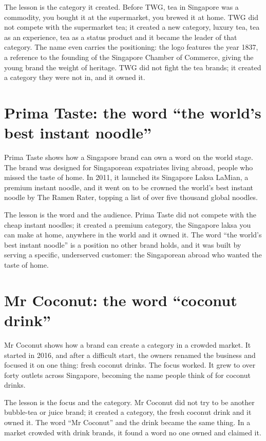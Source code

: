 \documentclass[10pt,twoside,openany]{memoir}
\newcommand{\needspacehead}{\needspace{4\baselineskip}}
\let\oldsection\section
\renewcommand{\section}{\needspacehead\oldsection}
\begin{document}
The lesson is the category it created. Before TWG, tea in Singapore was
a commodity, you bought it at the supermarket, you brewed it at home.
TWG did not compete with the supermarket tea; it created a new category,
luxury tea, tea as an experience, tea as a status product and it became
the leader of that category. The name even carries the positioning: the
logo features the year 1837, a reference to the founding of the
Singapore Chamber of Commerce, giving the young brand the weight of
heritage. TWG did not fight the tea brands; it created a category they
were not in, and it owned it.

\section{Prima Taste: the word ``the world's best instant
noodle''}\label{prima-taste-the-word-the-worlds-best-instant-noodle}

Prima Taste shows how a Singapore brand can own a word on the world
stage. The brand was designed for Singaporean expatriates living abroad,
people who missed the taste of home. In 2011, it launched its Singapore
Laksa LaMian, a premium instant noodle, and it went on to be crowned the
world's best instant noodle by The Ramen Rater, topping a list of over
five thousand global noodles.

The lesson is the word and the audience. Prima Taste did not compete
with the cheap instant noodles; it created a premium category, the
Singapore laksa you can make at home, anywhere in the world and it owned
it. The word ``the world's best instant noodle'' is a position no other
brand holds, and it was built by serving a specific, underserved
customer: the Singaporean abroad who wanted the taste of home.

\section{Mr Coconut: the word ``coconut
drink''}\label{mr-coconut-the-word-coconut-drink}

Mr Coconut shows how a brand can create a category in a crowded market.
It started in 2016, and after a difficult start, the owners renamed the
business and focused it on one thing: fresh coconut drinks. The focus
worked. It grew to over forty outlets across Singapore, becoming the
name people think of for coconut drinks.

The lesson is the focus and the category. Mr Coconut did not try to be
another bubble-tea or juice brand; it created a category, the fresh
coconut drink and it owned it. The word ``Mr Coconut'' and the drink
became the same thing. In a market crowded with drink brands, it found a
word no one owned and claimed it.
\end{document}
